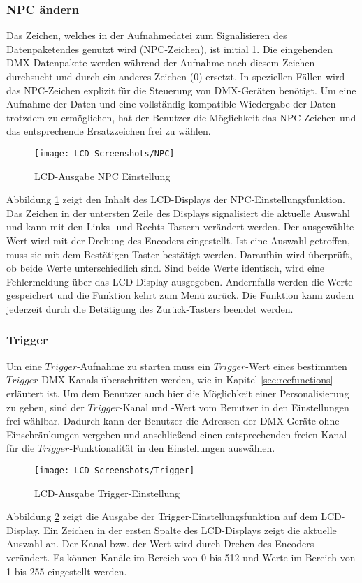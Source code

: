 \subsubsection{NPC ändern}
Das Zeichen, welches in der Aufnahmedatei zum Signalisieren des Datenpaketendes genutzt wird (NPC-Zeichen), ist initial 1. Die eingehenden DMX-Datenpakete werden während der Aufnahme nach diesem Zeichen durchsucht und durch ein anderes Zeichen (0) ersetzt. In speziellen Fällen wird das NPC-Zeichen explizit für die Steuerung von DMX-Geräten benötigt. Um eine Aufnahme der Daten und eine vollständig kompatible Wiedergabe der Daten trotzdem zu ermöglichen, hat der Benutzer die Möglichkeit das NPC-Zeichen und das entsprechende Ersatzzeichen frei zu wählen. 
\begin{figure}[h]
	\begin{center}
		\texttt{[image: LCD-Screenshots/NPC]}
		\caption{LCD-Ausgabe NPC Einstellung}
		\label{fig:npc}
	\end{center}
\end{figure}
Abbildung \ref{fig:npc} zeigt den Inhalt des LCD-Displays der NPC-Einstellungsfunktion. Das Zeichen in der untersten Zeile des Displays signalisiert die aktuelle Auswahl und kann mit den Links- und Rechts-Tastern verändert werden. Der ausgewählte Wert wird mit der Drehung des Encoders eingestellt. Ist eine Auswahl getroffen, muss sie mit dem Bestätigen-Taster bestätigt werden. Daraufhin wird überprüft, ob beide Werte unterschiedlich sind. Sind beide Werte identisch, wird eine Fehlermeldung über das LCD-Display ausgegeben. Andernfalls werden die Werte gespeichert und die Funktion kehrt zum Menü zurück. Die Funktion kann zudem jederzeit durch die Betätigung des Zurück-Tasters beendet werden.
\subsubsection{Trigger}
Um eine $Trigger$-Aufnahme zu starten muss ein $Trigger$-Wert eines bestimmten $Trigger$-DMX-Kanals überschritten werden, wie in Kapitel \ref{sec:recfunctions} erläutert ist. Um dem Benutzer auch hier die Möglichkeit einer Personalisierung zu geben, sind der $Trigger$-Kanal und -Wert vom Benutzer in den Einstellungen frei wählbar. Dadurch kann der Benutzer die Adressen der DMX-Geräte ohne Einschränkungen vergeben und anschließend einen entsprechenden freien Kanal für die $Trigger$-Funktionalität in den Einstellungen auswählen. 
\begin{figure}[h]
	\begin{center}
		\texttt{[image: LCD-Screenshots/Trigger]}
		\caption{LCD-Ausgabe Trigger-Einstellung}
		\label{fig:trig}
	\end{center}
\end{figure}
Abbildung \ref{fig:trig} zeigt die Ausgabe der Trigger-Einstellungsfunktion auf dem LCD-Display. Ein Zeichen in der ersten Spalte des LCD-Displays zeigt die aktuelle Auswahl an. Der Kanal bzw. der Wert wird durch Drehen des Encoders verändert. Es können Kanäle im Bereich von 0 bis 512 und Werte im Bereich von 1 bis 255 eingestellt werden. 
